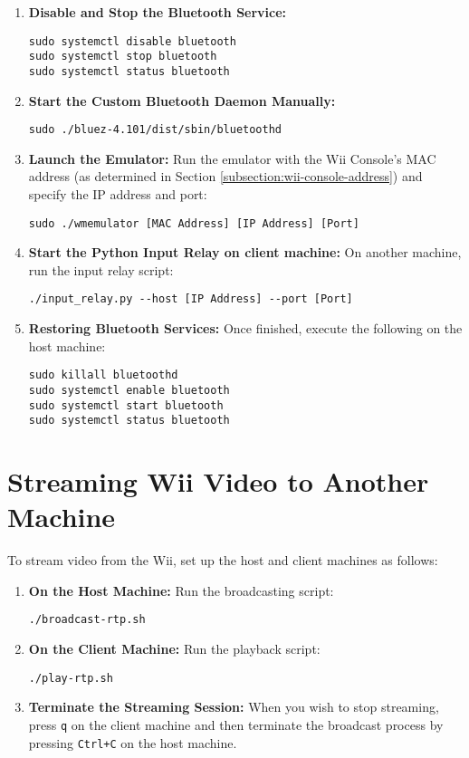 \begin{enumerate}
	\item \textbf{Disable and Stop the Bluetooth Service:}
	      \begin{verbatim}
sudo systemctl disable bluetooth
sudo systemctl stop bluetooth
sudo systemctl status bluetooth
    \end{verbatim}

	\item \textbf{Start the Custom Bluetooth Daemon Manually:}
	      \begin{verbatim}
sudo ./bluez-4.101/dist/sbin/bluetoothd
    \end{verbatim}

	\item \textbf{Launch the Emulator:}
	      Run the emulator with the Wii Console's MAC address (as determined in Section \ref{subsection:wii-console-address})
	      and specify the IP address and port:
	      \begin{verbatim}
sudo ./wmemulator [MAC Address] [IP Address] [Port]
    \end{verbatim}

	\item \textbf{Start the Python Input Relay on client machine:}
	      On another machine, run the input relay script:
	      \begin{verbatim}
./input_relay.py --host [IP Address] --port [Port]
\end{verbatim}


	\item \textbf{Restoring Bluetooth Services:}
	      Once finished, execute the following on the host machine:
	      \begin{verbatim}
sudo killall bluetoothd
sudo systemctl enable bluetooth
sudo systemctl start bluetooth
sudo systemctl status bluetooth
    \end{verbatim}
\end{enumerate}

\section{Streaming Wii Video to Another Machine}

To stream video from the Wii, set up the host and client machines as follows:

\begin{enumerate}
	\item \textbf{On the Host Machine:}
	      Run the broadcasting script:
	      \begin{verbatim}
./broadcast-rtp.sh
    \end{verbatim}

	\item \textbf{On the Client Machine:}
	      Run the playback script:
	      \begin{verbatim}
./play-rtp.sh
    \end{verbatim}


	\item \textbf{Terminate the Streaming Session:}
	      When you wish to stop streaming, press \texttt{q} on the client machine and then terminate the broadcast process by pressing \texttt{Ctrl+C} on the host machine.
\end{enumerate}
